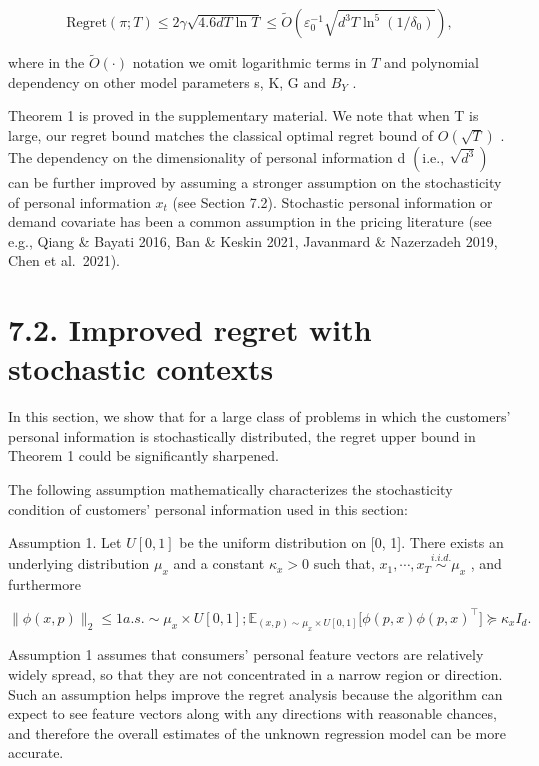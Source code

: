 \[
\mathrm{Regret} (\pi ; T) \leq 2 \gamma \sqrt {4 . 6 d T \ln T} \leq \widetilde {O} \left(\varepsilon_ {0} ^ {- 1} \sqrt {d ^ {3} T \ln^ {5} (1 / \delta_ {0})}\right),
\]

where in the \({ \widetilde { O } } ( \cdot )\) notation we omit logarithmic terms in \(T\) and polynomial dependency on other model parameters s, K, G and \(B _ { Y }\) .

Theorem 1 is proved in the supplementary material. We note that when T is large, our regret bound matches the classical optimal regret bound of \(O ( \sqrt { T } )\) . The dependency on the dimensionality of personal information d \(( \mathrm { i . e . , ~ } \sqrt { d ^ { 3 } } )\) can be further improved by assuming a stronger assumption on the stochasticity of personal information \(x _ { t }\) (see Section 7.2). Stochastic personal information or demand covariate has been a common assumption in the pricing literature (see e.g., Qiang \& Bayati 2016, Ban \& Keskin 2021, Javanmard \& Nazerzadeh 2019, Chen et al.~2021).

\section{7.2. Improved regret with stochastic contexts}\label{improved-regret-with-stochastic-contexts}

In this section, we show that for a large class of problems in which the customers' personal information is stochastically distributed, the regret upper bound in Theorem 1 could be significantly sharpened.

The following assumption mathematically characterizes the stochasticity condition of customers' personal information used in this section:

Assumption 1. Let \(U [ 0 , 1 ]\) be the uniform distribution on {[}0, 1{]}. There exists an underlying distribution \(\mu _ { x }\) and a constant \(\kappa _ { x } > 0\) such that, \(x _ { 1 } , \cdots , x _ { T } \overset { i . i . d . } { \sim } \mu _ { x }\) , and furthermore

\[
\| \phi (x, p) \| _ {2} \leq 1 a. s. \sim \mu_ {x} \times U [ 0, 1 ]; \mathbb {E} _ {(x, p) \sim \mu_ {x} \times U [ 0, 1 ]} \big [ \phi (p, x) \phi (p, x) ^ {\top} \big ] \succeq \kappa_ {x} I _ {d}.
\]

Assumption 1 assumes that consumers' personal feature vectors are relatively widely spread, so that they are not concentrated in a narrow region or direction. Such an assumption helps improve the regret analysis because the algorithm can expect to see feature vectors along with any directions with reasonable chances, and therefore the overall estimates of the unknown regression model can be more accurate.

